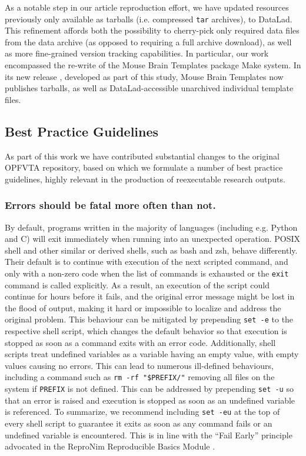 As a notable step in our article reproduction effort, we have updated resources previously only available as tarballs (i.e. compressed \texttt{tar} archives), to DataLad.
This refinement affords both the possibility to cherry-pick only required data files from the data archive (as opposed to requiring a full archive download), as well as more fine-grained version tracking capabilities.
In particular, our work encompassed the re-write of the Mouse Brain Templates package \cite{mbt05} Make system.
In its new release \cite{mbt10}, developed as part of this study, Mouse Brain Templates now publishes tarballs, as well as DataLad-accessible unarchived individual template files.


\subsection{Best Practice Guidelines}

As part of this work we have contributed substantial changes to the original OPFVTA repository, based on which we formulate a number of best practice guidelines, highly relevant in the production of reexecutable research outputs.

\subsubsection{Errors should be fatal more often than not.}

By default, programs written in the majority of languages (including e.g. Python and C) will exit immediately when running into an unexpected operation.
POSIX shell and other similar or derived shells, such as bash and zsh, behave differently.
Their default is to continue with execution of the next scripted command, and only with a non-zero code when the list of commands is exhausted or the \texttt{exit} command is called explicitly.
As a result, an execution of the script could continue for hours before it fails, and the original error message might be lost in the flood of output, making it hard or impossible to localize and address the original problem.
This behaviour can be mitigated by prepending \texttt{set -e} to the respective shell script, which changes the default behavior so that execution is stopped as soon as a command exits with an error code.
Additionally, shell scripts treat undefined variables as a variable having an empty value, with empty values causing no errors.
This can lead to numerous ill-defined behaviours, including a command such as \texttt{rm -rf "\${PREFIX}/"} removing all files on the system if \texttt{PREFIX} is not defined.
This can be addressed by prepending \texttt{set -u} so that an error is raised and execution is stopped as soon as an undefined variable is referenced.
To summarize, we recommend including \texttt{set -eu} at the top of every shell script to guarantee it exits as soon as any command fails or an undefined variable is encountered.
This is in line with the “Fail Early” principle advocated in the ReproNim Reproducible Basics Module \cite{repronim:reprobasics}.

